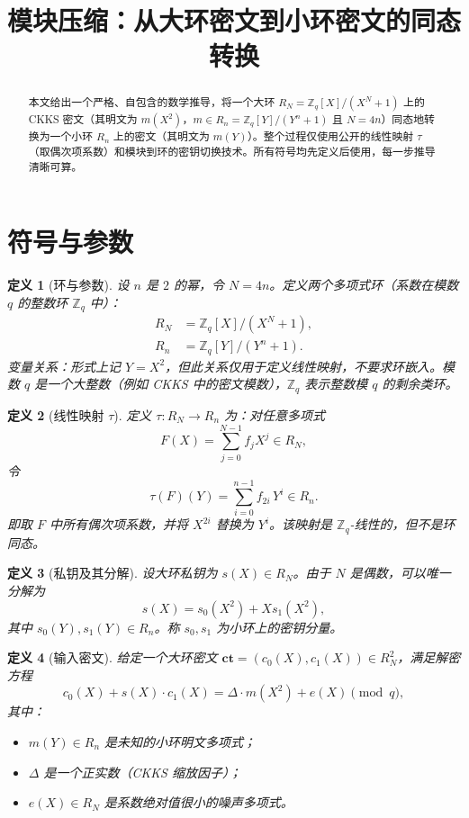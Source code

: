 \documentclass{article}
\title{模块压缩：从大环密文到小环密文的同态转换}
\author{}
\date{}
\newtheorem{definition}{定义}
\begin{document}
\maketitle

\begin{abstract}
本文给出一个严格、自包含的数学推导，将一个大环 $R_N=\mathbb{Z}_q[X]/(X^N+1)$ 上的 CKKS 密文（其明文为 $m(X^2)$，$m\in R_n=\mathbb{Z}_q[Y]/(Y^n+1)$ 且 $N=4n$）同态地转换为一个小环 $R_n$ 上的密文（其明文为 $m(Y)$）。整个过程仅使用公开的线性映射 $\tau$（取偶次项系数）和模块到环的密钥切换技术。所有符号均先定义后使用，每一步推导清晰可算。
\end{abstract}

\section{符号与参数}

\begin{definition}[环与参数]
设 $n$ 是 $2$ 的幂，令 $N = 4n$。定义两个多项式环（系数在模数 $q$ 的整数环 $\mathbb{Z}_q$ 中）：
\begin{align}
R_N &= \mathbb{Z}_q[X] / (X^N + 1), \\
R_n &= \mathbb{Z}_q[Y] / (Y^n + 1).
\end{align}
变量关系：形式上记 $Y = X^2$，但此关系仅用于定义线性映射，不要求环嵌入。模数 $q$ 是一个大整数（例如 CKKS 中的密文模数），$\mathbb{Z}_q$ 表示整数模 $q$ 的剩余类环。
\end{definition}

\begin{definition}[线性映射 $\tau$]
定义 $\tau: R_N \to R_n$ 为：对任意多项式
\[
F(X) = \sum_{j=0}^{N-1} f_j X^j \in R_N,
\]
令
\[
\tau(F)(Y) = \sum_{i=0}^{n-1} f_{2i} \, Y^i \in R_n.
\]
即取 $F$ 中所有偶次项系数，并将 $X^{2i}$ 替换为 $Y^i$。该映射是 $\mathbb{Z}_q$-线性的，但不是环同态。
\end{definition}

\begin{definition}[私钥及其分解]
设大环私钥为 $s(X) \in R_N$。由于 $N$ 是偶数，可以唯一分解为
\[
s(X) = s_0(X^2) + X s_1(X^2),
\]
其中 $s_0(Y), s_1(Y) \in R_n$。称 $s_0, s_1$ 为小环上的密钥分量。
\end{definition}

\begin{definition}[输入密文]
给定一个大环密文 $\mathbf{ct} = (c_0(X), c_1(X)) \in R_N^2$，满足解密方程
\[
c_0(X) + s(X) \cdot c_1(X) = \Delta \cdot m(X^2) + e(X) \pmod{q},
\]
其中：
\begin{itemize}
\item $m(Y) \in R_n$ 是未知的小环明文多项式；
\item $\Delta$ 是一个正实数（CKKS 缩放因子）；
\item $e(X) \in R_N$ 是系数绝对值很小的噪声多项式。
\end{itemize}
\end{definition}
\end{document}
